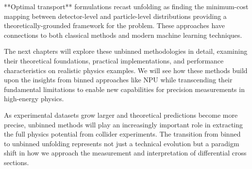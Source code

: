 **Optimal transport** formulations recast unfolding as finding the minimum-cost mapping between detector-level and particle-level distributions providing a theoretically-grounded framework for the problem. These approaches have connections to both classical methods and modern machine learning techniques.

The next chapters will explore these unbinned methodologies in detail, examining their theoretical foundations, practical implementations, and performance characteristics on realistic physics examples. We will see how these methods build upon the insights from binned approaches like NPU while transcending their fundamental limitations to enable new capabilities for precision measurements in high-energy physics.

As experimental datasets grow larger and theoretical predictions become more precise, unbinned methods will play an increasingly important role in extracting the full physics potential from collider experiments. The transition from binned to unbinned unfolding represents not just a technical evolution but a paradigm shift in how we approach the measurement and interpretation of differential cross sections.